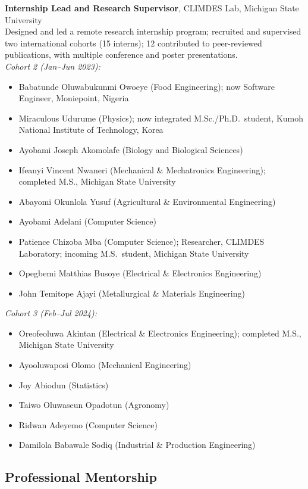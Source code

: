 \documentclass[11pt, letterpaper]{article}
\newcommand{\entry}[2]{%
  \begin{list}{}{%
    \setlength{\leftmargin}{0.17\linewidth}%
    \setlength{\labelwidth}{0.15\linewidth}%
    \setlength{\labelsep}{0.02\linewidth}%
    \setlength{\topsep}{3pt}%
    \setlength{\parsep}{2pt}%
    \setlength{\itemsep}{0pt}%
    \renewcommand{\makelabel}[1]{\parbox[t]{0.15\linewidth}{\small\raggedright\color{uwred}##1}\hfill}%
  }%
  \item[{#1}] #2%
  \end{list}%
}
\newcommand{\role}[1]{{\color{uwred}\textbf{#1}}}
\begin{document}
\entry{2023 --\\2024}{%
  \role{Internship Lead and Research Supervisor}, CLIMDES Lab, Michigan State University\\
  Designed and led a remote research internship program; recruited and supervised two international cohorts (15 interns); 12 contributed to peer-reviewed publications, with multiple conference and poster presentations.\\[3pt]
  \textit{Cohort 2 (Jan--Jun 2023):}
  \begin{itemize}
    \item Babatunde Oluwabukunmi Owoeye (Food Engineering); now Software Engineer, Moniepoint, Nigeria
    \item Miraculous Udurume (Physics); now integrated M.Sc./Ph.D.\ student, Kumoh National Institute of Technology, Korea
    \item Ayobami Joseph Akomolafe (Biology and Biological Sciences)
    \item Ifeanyi Vincent Nwaneri (Mechanical \& Mechatronics Engineering); completed M.S., Michigan State University
    \item Abayomi Okunlola Yusuf (Agricultural \& Environmental Engineering)
    \item Ayobami Adelani (Computer Science)
    \item Patience Chizoba Mba (Computer Science); Researcher, CLIMDES Laboratory; incoming M.S.\ student, Michigan State University
    \item Opegbemi Matthias Busoye (Electrical \& Electronics Engineering)
    \item John Temitope Ajayi (Metallurgical \& Materials Engineering)
  \end{itemize}
  \textit{Cohort 3 (Feb--Jul 2024):}
  \begin{itemize}
    \item Oreofeoluwa Akintan (Electrical \& Electronics Engineering); completed M.S., Michigan State University
    \item Ayooluwaposi Olomo (Mechanical Engineering)
    \item Joy Abiodun (Statistics)
    \item Taiwo Oluwaseun Opadotun (Agronomy)
    \item Ridwan Adeyemo (Computer Science)
    \item Damilola Babawale Sodiq (Industrial \& Production Engineering)
  \end{itemize}
}

\subsection*{Professional Mentorship}
\end{document}
